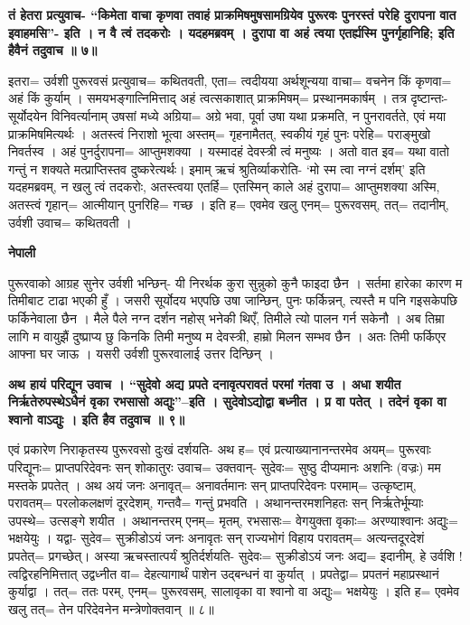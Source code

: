 \documentclass[11pt, a5paper]{article}
\begin{document}
\textbf{तं हेतरा प्रत्युवाच- “किमेता वाचा कृणवा तवाहं प्राक्रमिषमुषसामग्रियेव पुरूरवः पुनरस्तं परेहि दुरापना वात इवाहमसि”- इति । न वै त्वं तदकरोः । यदहमब्रवम् । दुरापा वा अहं त्वया एतर्ह्यस्मि पुनर्गृहानिहि; इति हैवैनं तदुवाच ॥ ७॥}

इतरा= उर्वशी पुरूरवसं प्रत्युवाच= कथितवती, एता= त्वदीयया अर्थशून्यया वाचा= वचनेन किं कृणवा= अहं किं कुर्याम् । समयभङ्गात्निमित्ताद् अहं त्वत्सकाशात् प्राक्रमिषम्= प्रस्थानमकार्षम् । तत्र दृष्टान्तः- सूर्योदयेन विनिवर्त्यानाम् उषसां मध्ये अग्रिया= अग्रे भवा, पूर्वा उषा यथा प्रक्रमति, न पुनरावर्तते, एवं मया प्राक्रमिषमित्यर्थः । अतस्त्वं निराशो भूत्वा अस्तम्= गृहनामैतत्, स्वकीयं गृहं पुनः परेहि= पराङ्‌मुखो निवर्तस्व । अहं पुनर्दुरापना= आप्तुमशक्या । यस्मादहं देवस्त्री त्वं मनुष्यः । अतो वात इव= यथा वातो गन्तुं न शक्यते मत्प्राप्तिस्तव दुष्करेत्यर्थः। इमाम् ऋचं श्रुतिर्व्याकरोति- ‘मो स्म त्वा नग्नं दर्शम्’ इति यदहमब्रवम्, न खलु त्वं तदकरोः, अतस्त्वया एतर्हि= एतस्मिन् काले अहं दुरापा= आप्तुमशक्या अस्मि, अतस्त्वं गृहान्= आत्मीयान् पुनरिहि= गच्छ । इति ह= एवमेव खलु एनम्= पुरूरवसम्, तत्= तदानीम्, उर्वशी उवाच= कथितवती ।

\textbf{नेपाली}

पुरूरवाको आग्रह सुनेर उर्वशी भन्छिन्- यी निरर्थक कुरा सुन्नुको कुनै फाइदा छैन । सर्तमा हारेका कारण म तिमीबाट टाढा भएकी हुँ । जसरी सूर्योदय भएपछि उषा जान्छिन्, पुनः फर्किन्नन्, त्यस्तै म पनि गइसकेपछि फर्किनेवाला छैन । मैले पैले नग्न दर्शन नहोस् भनेकी थिएँ, तिमीले त्यो पालन गर्न सकेनौ । अब तिम्रा लागि म वायुझैं दुष्प्राप्य छु किनकि तिमी मनुष्य म देवस्त्री, हाम्रो मिलन सम्भव छैन ।  अतः तिमी फर्किएर आफ्ना घर जाऊ । यसरी उर्वशी पुरूरवालाई उत्तर दिन्छिन् ।

\textbf{अथ हायं परिद्यून उवाच । “सुदेवो अद्य प्रपते दनावृत्परावतं परमां गंतवा उ । अधा शयीत निर्ऋतेरुपस्थेऽधैनं वृका रभसासो अद्युः”--इति । सुदेवोऽद्योद्वा बध्नीत । प्र वा पतेत् । तदेनं वृका वा श्वानो वाऽद्युः । इति हैव तदुवाच ॥ ९॥}

एवं प्रकारेण निराकृतस्य पुरूरवसो दुःखं दर्शयति- अथ ह= एवं प्रत्याख्यानानन्तरमेव अयम्= पुरूरवाः परिद्यूनः= प्राप्तपरिदेवनः सन् शोकातुरः उवाच= उक्तवान्- सुदेवः= सुष्ठु दीप्यमानः अशनिः (वज्रः) मम मस्तके प्रपतेत् । अथ अयं जनः अनावृत्= अनावर्तमानः सन् प्राप्तपरिदेवनः परमाम्= उत्कृष्टाम्, परावतम्= परलोकलक्षणं दूरदेशम्, गन्तवै= गन्तुं प्रभवति । अथानन्तरमशनिहतः सन् निर्ऋतेर्भूम्याः उपस्थे= उत्सङ्गे शयीत । अथानन्तरम् एनम्= मृतम्, रभसासः= वेगयुक्ता वृकाः= अरण्याश्वानः अद्युः= भक्षयेयुः । यद्वा- सुदेव= सुक्रीडोऽयं जनः अनावृतः सन् राज्यभोगं विहाय परावतम्= अत्यन्तदूरदेशं प्रपतेत्= प्रगच्छेत्। अस्या ऋचस्तात्पर्यं श्रुतिर्दर्शयति- सुदेवः= सुक्रीडोऽयं जनः अद्य= इदानीम्, हे उर्वशि ! त्वद्विरहनिमित्तात् उद्वध्नीत वा= देहत्यागार्थं पाशेन उद्बन्धनं वा कुर्यात् । प्रपतेद्वा= प्रपतनं महाप्रस्थानं कुर्याद्वा । तत्= ततः परम्, एनम्= पुरूरवसम्, सालावृका वा श्वानो वा अद्युः= भक्षयेयुः । इति ह= एवमेव खलु तत्= तेन परिदेवनेन मन्त्रेणोक्तवान् ॥ ८॥
\end{document}
